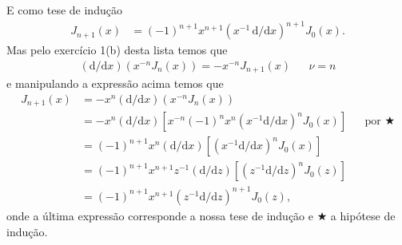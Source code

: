 \documentclass[a4paper,12pt, leqno, answers]{exam}
\begin{document}
\begin{questions}
\begin{solution}
        E como tese de indu\c{c}\~{a}o
        \begin{align*}
            J_{n + 1}(x) &= (-1)^{n + 1} x^{n + 1} \left( x^{-1} \,\mathrm{d}/\mathrm{d}x \right)^{n + 1} J_0(x).
        \end{align*}
        Mas pelo exerc\'{i}cio 1(b) desta lista temos que
        \begin{align*}
            \left( \mathrm{d}/\mathrm{d}x \right) \left( x^{-n} J_n(x) \right) = - x^{-n} J_{n + 1}(x) && \nu = n
        \end{align*}
        e manipulando a express\~{a}o acima temos que
        \begin{align*}
            J_{n + 1}(x) &= - x^n \left( \mathrm{d}/\mathrm{d}x \right) \left( x^{-n} J_n(x) \right) \\
            &= - x^n \left( \mathrm{d}/\mathrm{d}x \right) \left[ x^{-n} (-1)^n x^n \left( x^{-1} \mathrm{d}/\mathrm{d}x \right)^n J_0(x) \right] && \text{por $\bigstar$} \\
            &= (-1)^{n + 1} x^n \left( \mathrm{d}/\mathrm{d}x \right) \left[ \left( x^{-1} \mathrm{d}/\mathrm{d}x \right)^n J_0(x) \right] \\
            &= (-1)^{n + 1} x^{n + 1} z^{-1} \left( \mathrm{d}/\mathrm{d}z \right) \left[ \left( z^{-1} \mathrm{d}/\mathrm{d}z \right)^n J_0(z) \right] \\
            &= (-1)^{n + 1} x^{n + 1} \left( z^{-1} \mathrm{d}/\mathrm{d}z \right)^{n + 1} J_0(z),
        \end{align*}
        onde a \'{u}ltima express\~{a}o corresponde a nossa tese de indu\c{c}\~{a}o e $\bigstar$ a hip\'{o}tese de indu\c{c}\~{a}o.
    \end{solution}


\end{questions}
\end{document}
